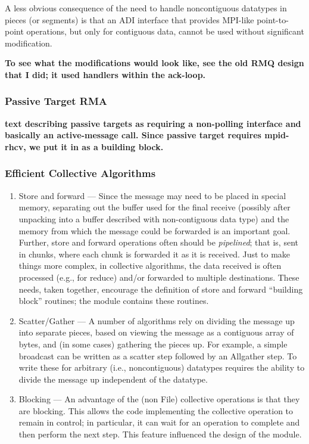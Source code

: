 \documentclass{article}
\begin{document}
A less obvious consequence of the need to handle noncontiguous
datatypes in pieces (or segments) is that an ADI interface that
provides MPI-like point-to-point operations, but only for contiguous
data, cannot be used without significant modification.  

\textbf{To see what the modifications would look like, see the old RMQ design that I did; it used
handlers within the ack-loop.} 

\subsubsection{Passive Target RMA}
\label{sec-passive-target}
\textbf{text describing passive targets as requiring a non-polling
interface and basically an active-message call.  Since passive target
requires mpid-rhcv, we put it in as a building block.}

\subsubsection{Efficient Collective Algorithms}
\begin{enumerate}
\item Store and forward --- Since the message may need to be placed in
special memory, separating out the buffer used for the final receive
(possibly after unpacking into a buffer described with non-contiguous
data type) and the memory from which the message could be forwarded is
an important goal.  Further, store and
forward operations often should be \emph{pipelined}; that is, sent in
chunks, where each chunk is forwarded it as it is received.
Just to make things more complex, in collective algorithms, the data
received is often processed (e.g., for reduce) and/or forwarded to
multiple destinations.  These needs, taken together, encourage the
definition of store and forward ``building block'' routines; the 
module contains these routines.

\item Scatter/Gather --- A number of algorithms rely on dividing the
message up into separate pieces, based on viewing the message as a
contiguous array of bytes, and (in some cases) gathering the pieces
up.  For example, a simple broadcast can be written as a scatter step
followed by an Allgather step.  To write these for arbitrary (i.e.,
noncontiguous) datatypes requires the ability to divide the message up
independent of the datatype.  

\item Blocking --- An advantage of the (non File) collective
operations is that they are blocking.  This allows the code
implementing the collective operation to remain in control; in
particular, it can wait for an operation to complete and then perform
the next step.  This feature influenced the design of the
 module.
\end{enumerate}
\end{document}
